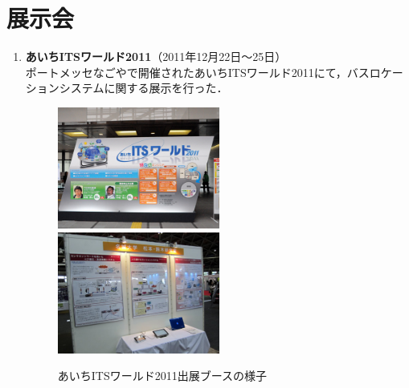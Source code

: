 \section*{展示会}
\begin{enumerate}
\item {\bf あいちITSワールド2011}（2011年12月22日〜25日）\\
ポートメッセなごやで開催されたあいちITSワールド2011にて，バスロケーションシステムに関する展示を行った．

\begin{figure}[ht]
	\centering
	\includegraphics[clip,height=4.0cm]{fig/ITSworld1.jpg}
	\quad
	\includegraphics[clip,height=4.0cm]{fig/ITSworld2.jpg}
	\caption{あいちITSワールド2011出展ブースの様子}
	\label{fig:ITSworld}
\end{figure}
\end{enumerate}

\endinput